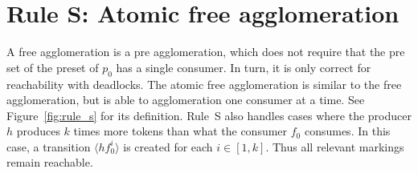 \section*{Rule S: Atomic free agglomeration}\label{sec:rule_s}
A free agglomeration is a pre agglomeration, which does not require that the pre set of the preset of $p_0$ has a single consumer.
In turn, it is only correct for reachability with deadlocks.
The atomic free agglomeration is similar to the free agglomeration, but is able to agglomeration one consumer at a time.
See Figure~\ref{fig:rule_s} for its definition.
Rule~S also handles cases where the producer $h$ produces $k$ times more tokens than what the consumer $f_0$ consumes.
In this case, a transition $\langle h f_0^i\rangle$ is created for each $i\in [1, k]$.
Thus all relevant markings remain reachable.

